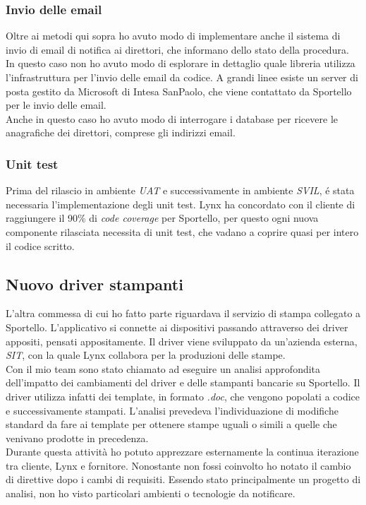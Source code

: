 \subsubsection{Invio delle email}
Oltre ai metodi qui sopra ho avuto modo di implementare anche il sistema di invio di email di notifica ai direttori, che informano dello stato della procedura. \\
In questo caso non ho avuto modo di esplorare in dettaglio quale libreria utilizza l'infrastruttura per l'invio delle email da codice. A grandi linee esiste un server di posta gestito da Microsoft di Intesa SanPaolo, che viene contattato da Sportello per le invio delle email. \\
Anche in questo caso ho avuto modo di interrogare i database per ricevere le anagrafiche dei direttori, comprese gli indirizzi email. 

\subsubsection{Unit test}
Prima del rilascio in ambiente \textit{UAT} e successivamente in ambiente \textit{SVIL}, é stata necessaria l'implementazione degli unit test. Lynx ha concordato con il cliente di raggiungere il 90\% di \textit{code coverage} per Sportello, per questo ogni nuova componente rilasciata necessita di unit test, che vadano a coprire quasi per intero il codice scritto.

\subsection{Nuovo driver stampanti}
L'altra commessa di cui ho fatto parte riguardava il servizio di stampa collegato a Sportello. L'applicativo si connette ai dispositivi passando attraverso dei driver appositi, pensati appositamente. Il driver viene sviluppato da un'azienda esterna, \textit{SIT}, con la quale Lynx collabora per la produzioni delle stampe. \\
Con il mio team sono stato chiamato ad eseguire un analisi approfondita dell'impatto dei cambiamenti del driver e delle stampanti bancarie su Sportello. Il driver utilizza infatti dei template, in formato \textit{.doc}, che vengono popolati a codice e successivamente stampati. L'analisi prevedeva l'individuazione di modifiche standard da fare ai template per ottenere stampe uguali o simili a quelle che venivano prodotte in precedenza. \\
Durante questa attività ho potuto apprezzare esternamente la continua iterazione tra cliente, Lynx e fornitore. Nonostante non fossi coinvolto ho notato il cambio di direttive dopo i cambi di requisiti. Essendo stato principalmente un progetto di analisi, non ho visto particolari ambienti o tecnologie da notificare. 